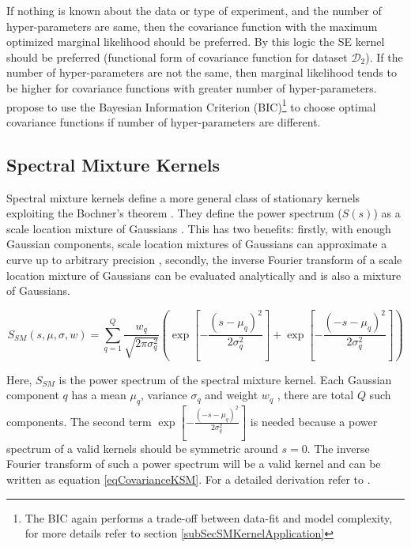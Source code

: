 If nothing is known about the data or type of experiment, and the number of hyper-parameters are same, then the covariance function with the maximum optimized marginal likelihood should be preferred. By this logic the SE kernel should be preferred (functional form of covariance function for dataset $\mathcal{D}_{2}$). If the number of hyper-parameters are not the same, then marginal likelihood tends to be higher for covariance functions with greater number of hyper-parameters. \cite{duvenaud-thesis-2014, lloyd2014automatic} propose to use the Bayesian Information Criterion (BIC)\footnote{The BIC again performs a trade-off between data-fit and model complexity, for more details refer to section \ref{subSecSMKernelApplication}} to choose optimal covariance functions if number of hyper-parameters are different. 

\subsection{Spectral Mixture Kernels}\label{subSecSMKernel}
Spectral mixture kernels define a more general class of stationary kernels exploiting the Bochner's theorem \cite{bochner1959lectures}. They define the power spectrum ($S(s)$) as a scale location mixture of Gaussians \cite{wilson2013gaussian}. This has two benefits: firstly, with enough Gaussian components, scale location mixtures of Gaussians can approximate a curve up to arbitrary precision \cite{kostantinos2000gaussian, bishop2006pattern}, secondly, the inverse Fourier transform of a scale location mixture of Gaussians can be evaluated analytically and is also a mixture of Gaussians.

\begin{equation}\label{eqPowerSpectrumSSM}
    S_{SM}(s, \mu, \sigma, w) = \sum_{q=1}^{Q} \frac{w_{q}}{\sqrt{2\pi\sigma_{q}^2}}
\left ( \exp\left [ {-\frac{{(s-\mu_{q})^2}}{2\sigma_{q}^{2}}} \right ] + \exp\left [ {-\frac{{(-s-\mu_{q})^2}}{2\sigma_{q}^{2}}} \right ] \right  )
\end{equation}

Here, $ S_{SM}$ is the power spectrum of the spectral mixture kernel. Each Gaussian  component $q$ has a mean $\mu_{q}$, variance $\sigma_{q}$ and weight $w_{q}$ , there are total $Q$ such components. The second term $\exp\left [ {-\frac{{(-s-\mu_{q})^2}}{2\sigma_{q}^{2}}} \right ]$ is needed because a power spectrum of a valid kernels should be symmetric around $s=0$. The inverse Fourier transform of such a power spectrum will be a valid kernel and can be written as equation \ref{eqCovarianceKSM}. For a detailed derivation refer to \cite{wilson2014thesis}.


